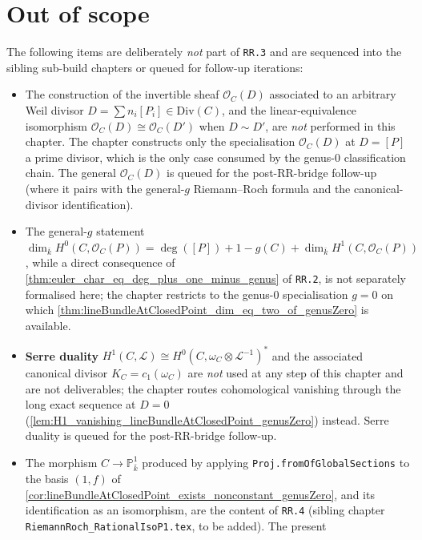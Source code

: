 \section{Out of scope}

The following items are deliberately \emph{not} part of \texttt{RR.3}
and are sequenced into the sibling sub-build chapters or queued for
follow-up iterations:

\begin{itemize}
  \item The construction of the invertible sheaf \(\mathcal O_C(D)\)
    associated to an arbitrary Weil divisor $D = \sum n_i [P_i] \in
    \mathrm{Div}(C)$, and the linear-equivalence isomorphism
    \(\mathcal O_C(D) \cong \mathcal O_C(D')\) when \(D \sim D'\), are
    \emph{not} performed in this chapter. The chapter constructs only
    the specialisation \(\mathcal O_C(D)\) at \(D = [P]\) a prime divisor,
    which is the only case consumed by the genus-\(0\) classification
    chain. The general \(\mathcal O_C(D)\) is queued for the
    post-RR-bridge follow-up (where it pairs with the general-\(g\)
    Riemann--Roch formula and the canonical-divisor identification).
  \item The general-\(g\) statement
    $\dim_{\bar k} H^0(C, \mathcal O_C(P)) = \deg([P]) + 1 -
    g(C) + \dim_{\bar k} H^1(C, \mathcal O_C(P))$, while a direct
    consequence of
    \cref{thm:euler_char_eq_deg_plus_one_minus_genus} of \texttt{RR.2},
    is not separately formalised here; the chapter restricts to the
    genus-\(0\) specialisation \(g = 0\) on which
    \cref{thm:lineBundleAtClosedPoint_dim_eq_two_of_genusZero} is
    available.
  \item \textbf{Serre duality} $H^1(C, \mathcal L) \cong
    H^0(C, \omega_C \otimes \mathcal L^{-1})^*$ and the associated
    canonical divisor \(K_C = c_1(\omega_C)\) are \emph{not} used at any
    step of this chapter and are not deliverables; the chapter routes
    cohomological vanishing through the long exact sequence at
    \(D = 0\) (\cref{lem:H1_vanishing_lineBundleAtClosedPoint_genusZero})
    instead. Serre duality is queued for the post-RR-bridge follow-up.
  \item The morphism \(C \to \mathbb P^1_{\bar k}\) produced by applying
    \texttt{Proj.fromOfGlobalSections} to the basis \((1, f)\) of
    \cref{cor:lineBundleAtClosedPoint_exists_nonconstant_genusZero},
    and its identification as an isomorphism, are the content of
    \texttt{RR.4} (sibling chapter
    \texttt{RiemannRoch\_RationalIsoP1.tex}, to be added). The present

\end{itemize}
